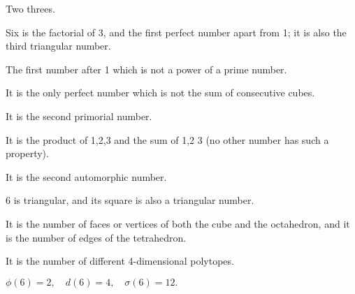 Two threes.
\par
Six is the factorial of 3, and the first perfect number apart from 1;
it is also the third triangular number.

\par
The first number after 1 which is not a power of a prime number.
\par
It is the only perfect number which is not the sum of
consecutive cubes.
\par
It is the second primorial number.
\par
It is the product of 1,2,3 and the sum of 1,2 3 (no other 
number has such a property).
\par
It is the second automorphic number.
\par
6 is triangular, and its square is also a triangular number.
\par
It is the number of faces or vertices of both the cube and
the octahedron, and it is the number of edges of the tetrahedron.
\par
It is the number of different 4-dimensional polytopes.
\par
$ \phi(6)=2, \quad d(6)=4, \quad \sigma(6)=12 . $
